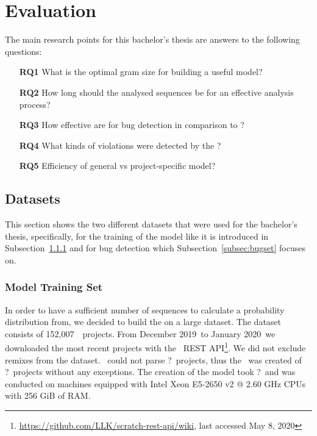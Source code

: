 
\newcommand{\numlarge}{152,007}
\newcommand{\monthstart}{December 2019}
\newcommand{\monthend}{January 2020}
\newcommand{\parsingexcp}{?}
\newcommand{\successfullyanalysed}{?}
\newcommand{\creationtime}{?}

\chapter{Evaluation}\label{chap:evaluation}

The main research points for this bachelor's thesis are answers to the following questions:
\begin{itemize}
\item[\textbf{RQ1}] What is the optimal gram size for building a useful model?
\item[\textbf{RQ2}] How long should the analysed sequences be for an effective analysis process?
\item[\textbf{RQ3}] How effective are  for bug detection in comparison to \litterbox{}?
\item[\textbf{RQ4}] What kinds of violations were detected by the \ngram{}?
\item[\textbf{RQ5}] Efficiency of general \ngram{} vs project-specific model?
\end{itemize}


\section{Datasets}\label{sec:dataset}
This section shows the two different datasets that were used for the bachelor's thesis, specifically, for the training of the model like it is introduced in Subsection~\ref{subsec:trainingset} and for bug detection which Subsection~\ref{subsec:bugset} focuses on.

\subsection{Model Training Set}\label{subsec:trainingset}
In order to have a sufficient number of sequences to calculate a probability distribution from, we decided to build the \ngram{} on a large dataset. The dataset consists of \numlarge\ \scratch\ projects. From \monthstart\ to \monthend\ we downloaded the most recent projects with the \scratch\ REST API\footnote{\url{https://github.com/LLK/scratch-rest-api/wiki}, last accessed May 8, 2020}. We did not exclude remixes from the dataset. \litterbox\ could not parse \parsingexcp\ projects, thus the \ngram\ was created of \successfullyanalysed\ projects without any exceptions. The creation of the model took \creationtime\ and was conducted on machines equipped with Intel Xeon E5-2650 v2 @ 2.60 GHz CPUs with 256 GiB of RAM.

